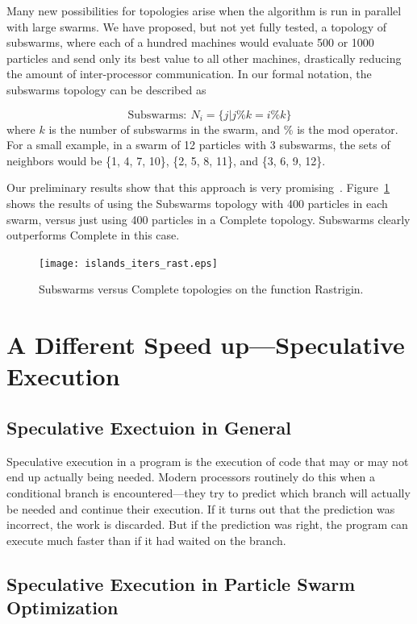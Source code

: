 \documentclass[onecolumn, 12pt]{article}
\begin{document}
Many new possibilities for topologies arise when the algorithm is run in
parallel with large swarms.  We have proposed, but not yet fully tested, a
topology of subswarms, where each of a hundred machines would evaluate 500 or
1000 particles and send only its best value to all other machines, drastically
reducing the amount of inter-processor communication.  In our formal notation,
the subswarms topology can be described as

\[\mathrm{Subswarms:}\ N_i = \{j|j\%k = i\%k\}\]
where $k$ is the number of subswarms in the swarm, and \% is the mod operator.
For a small example, in a swarm of 12 particles with 3 subswarms, the sets of
neighbors would be \{1, 4, 7, 10\}, \{2, 5, 8, 11\}, and \{3, 6, 9, 12\}.

Our preliminary results show that this approach is very
promising~\cite{mcnabb-cec09}.  Figure~\ref{fig:subswarms} shows the results
of using the Subswarms topology with 400 particles in each swarm, versus just
using 400 particles in a Complete topology.  Subswarms clearly outperforms
Complete in this case.

\begin{figure}
  \centering
  \texttt{[image: islands\_iters\_rast.eps]}
  \caption{Subswarms versus Complete topologies on the function Rastrigin.}
  \label{fig:subswarms}
\end{figure}

\section{A Different Speed up---Speculative Execution}
\label{sec:specex}

\subsection{Speculative Exectuion in General}

Speculative execution in a program is the execution of code that may or may not
end up actually being needed.  Modern processors routinely do this when a
conditional branch is encountered---they try to predict which branch will
actually be needed and continue their execution.  If it turns out that the
prediction was incorrect, the work is discarded.  But if the prediction was
right, the program can execute much faster than if it had waited on the branch.  
\subsection{Speculative Execution in Particle Swarm Optimization}
\end{document}

